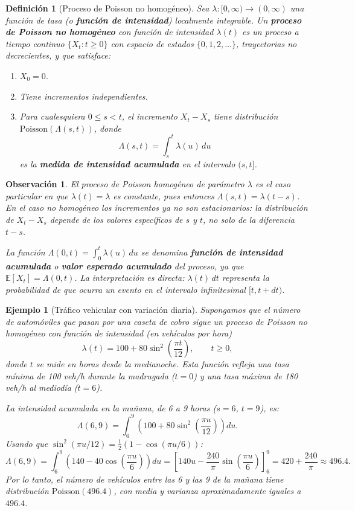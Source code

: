 \documentclass[12pt]{book}
\newtheorem{definition}{Definición}[chapter]
\newtheorem{example}{Ejemplo}[chapter]
\newtheorem{remark}{Observación}[chapter]
\begin{document}
\begin{definition}[Proceso de Poisson no homogéneo]
Sea $\lambda : [0, \infty) \to (0, \infty)$ una función de tasa (o \textbf{función de intensidad}) localmente integrable. Un \textbf{proceso de Poisson no homogéneo} con función de intensidad $\lambda(t)$ es un proceso a tiempo continuo $\{X_t : t \ge 0\}$ con espacio de estados $\{0,1,2,\ldots\}$, trayectorias no decrecientes, y que satisface:
\begin{enumerate}
    \item[\normalfont(a)] $X_0 = 0$.
    \item[\normalfont(b)] Tiene incrementos independientes.
    \item[\normalfont(c)] Para cualesquiera $0 \le s < t$, el incremento $X_t - X_s$ tiene distribución $\mathrm{Poisson}(\Lambda(s,t))$, donde
    \[
        \Lambda(s,t) = \int_s^t \lambda(u)\, du
    \]
    es la \textbf{medida de intensidad acumulada} en el intervalo $(s, t]$.
\end{enumerate}
\end{definition}

\begin{remark}
El proceso de Poisson homogéneo de parámetro $\lambda$ es el caso particular en que $\lambda(t) = \lambda$ es constante, pues entonces $\Lambda(s,t) = \lambda(t-s)$. En el caso no homogéneo los incrementos ya \textit{no} son estacionarios: la distribución de $X_t - X_s$ depende de los valores específicos de $s$ y $t$, no solo de la diferencia $t - s$.

La función $\Lambda(0,t) = \int_0^t \lambda(u)\,du$ se denomina \textbf{función de intensidad acumulada} o \textbf{valor esperado acumulado} del proceso, ya que $\mathbb{E}[X_t] = \Lambda(0,t)$. La interpretación es directa: $\lambda(t)\,dt$ representa la probabilidad de que ocurra un evento en el intervalo infinitesimal $[t, t+dt)$.
\end{remark}

\begin{example}[Tráfico vehicular con variación diaria]
Supongamos que el número de automóviles que pasan por una caseta de cobro sigue un proceso de Poisson no homogéneo con función de intensidad (en vehículos por hora)
\[
    \lambda(t) = 100 + 80\sin^2\!\left(\frac{\pi t}{12}\right), \qquad t \ge 0,
\]
donde $t$ se mide en horas desde la medianoche. Esta función refleja una tasa mínima de 100 veh/h durante la madrugada ($t=0$) y una tasa máxima de 180 veh/h al mediodía ($t=6$).

La intensidad acumulada en la mañana, de 6 a 9 horas ($s=6$, $t=9$), es:
\[
    \Lambda(6,9) = \int_6^9 \left(100 + 80\sin^2\!\left(\frac{\pi u}{12}\right)\right) du.
\]
Usando que $\sin^2(\pi u/12) = \tfrac{1}{2}(1 - \cos(\pi u/6))$:
\[
    \Lambda(6,9) = \int_6^9 \left(140 - 40\cos\!\left(\frac{\pi u}{6}\right)\right)du
    = \left[140u - \frac{240}{\pi}\sin\!\left(\frac{\pi u}{6}\right)\right]_6^9
    = 420 + \frac{240}{\pi} \approx 496.4.
\]
Por lo tanto, el número de vehículos entre las 6 y las 9 de la mañana tiene distribución $\mathrm{Poisson}(496.4)$, con media y varianza aproximadamente iguales a $496.4$.
\end{example}
\end{document}
